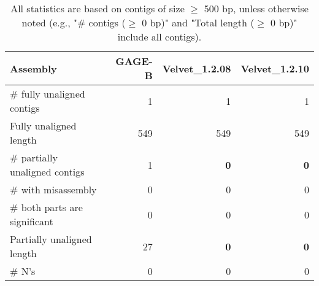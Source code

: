 \documentclass[12pt,a4paper]{article}
\begin{document}
\begin{table}[ht]
\begin{center}
\caption{All statistics are based on contigs of size $\geq$ 500 bp, unless otherwise noted (e.g., "\# contigs ($\geq$ 0 bp)" and "Total length ($\geq$ 0 bp)" include all contigs).}
\begin{tabular}{|l*{3}{|r}|}
\hline
Assembly & GAGE-B & Velvet\_1.2.08 & Velvet\_1.2.10 \\ \hline
\# fully unaligned contigs & 1 & 1 & 1 \\ \hline
Fully unaligned length & 549 & 549 & 549 \\ \hline
\# partially unaligned contigs & 1 & {\bf 0} & {\bf 0} \\ \hline
\hspace{5mm}\# with misassembly & 0 & 0 & 0 \\ \hline
\hspace{5mm}\# both parts are significant & 0 & 0 & 0 \\ \hline
Partially unaligned length & 27 & {\bf 0} & {\bf 0} \\ \hline
\# N's & 0 & 0 & 0 \\ \hline
\end{tabular}
\end{center}
\end{table}
\end{document}
